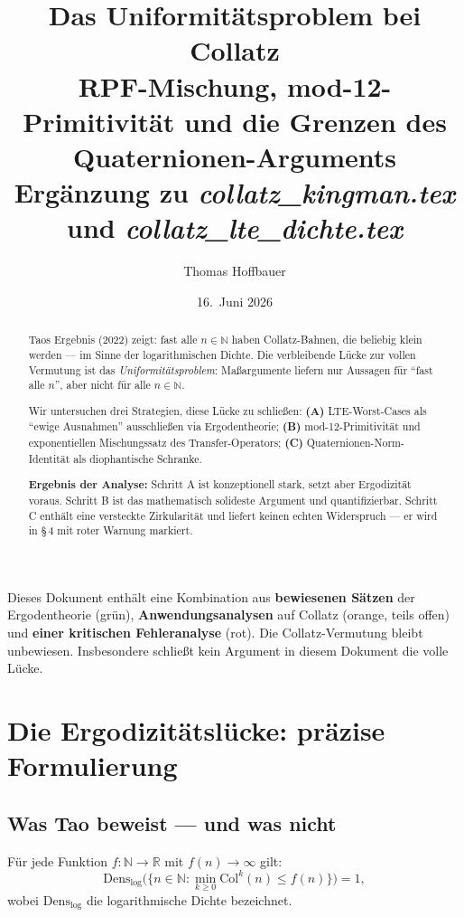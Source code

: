 \documentclass[12pt,a4paper]{article}
\title{%
  Das Uniformitätsproblem bei Collatz\\[0.3em]
  \large RPF-Mischung, mod-12-Primitivität und die Grenzen des
  Quaternionen-Arguments\\[0.5em]
  \normalsize Ergänzung zu \textit{collatz\_kingman.tex} und
  \textit{collatz\_lte\_dichte.tex}%
}
\author{Thomas Hoffbauer}
\date{16.\ Juni 2026}
\newcommand{\N}{\mathbb{N}}
\newcommand{\R}{\mathbb{R}}
\newcommand{\col}{\mathrm{Col}}
\begin{document}
\maketitle

\begin{abstract}
Taos Ergebnis (2022) zeigt: fast alle $n \in \N$ haben Collatz-Bahnen,
die beliebig klein werden --- im Sinne der logarithmischen Dichte.
Die verbleibende Lücke zur vollen Vermutung ist das
\emph{Uniformitätsproblem}: Maßargumente liefern nur Aussagen für
``fast alle $n$'', aber nicht für alle $n \in \N$.

Wir untersuchen drei Strategien, diese Lücke zu schließen:
\textbf{(A)} LTE-Worst-Cases als ``ewige Ausnahmen'' ausschließen via
Ergodentheorie;
\textbf{(B)} mod-12-Primitivität und exponentiellen Mischungssatz
des Transfer-Operators;
\textbf{(C)} Quaternionen-Norm-Identität als diophantische Schranke.

\textbf{Ergebnis der Analyse:}
Schritt A ist konzeptionell stark, setzt aber Ergodizität voraus.
Schritt B ist das mathematisch solideste Argument und quantifizierbar.
Schritt C enthält eine versteckte Zirkularität und liefert
keinen echten Widerspruch --- er wird in \S\,4 mit roter Warnung markiert.
\end{abstract}

\tableofcontents

\bigskip
\begin{tcolorbox}[warnung, title={Einordnung dieses Dokuments}]
Dieses Dokument enthält eine Kombination aus \textbf{bewiesenen Sätzen}
der Ergodentheorie (grün), \textbf{Anwendungsanalysen} auf Collatz
(orange, teils offen) und \textbf{einer kritischen Fehleranalyse} (rot).
Die Collatz-Vermutung bleibt unbewiesen.
Insbesondere schließt kein Argument in diesem Dokument die volle Lücke.
\end{tcolorbox}

\section{Die Ergodizitätslücke: präzise Formulierung}
\label{sec:luecke}

\subsection{Was Tao beweist --- und was nicht}

\begin{tcolorbox}[tao, title={Taos Hauptergebnis (Forum Math.\ Pi, 2022)}]
Für jede Funktion $f: \N \to \R$ mit $f(n) \to \infty$ gilt:
\[
  \mathrm{Dens}_{\log}\bigl(\{n \in \N : \min_{k\geq 0}\col^k(n) \leq f(n)\}\bigr) = 1,
\]
wobei $\mathrm{Dens}_{\log}$ die logarithmische Dichte bezeichnet.
\end{tcolorbox}
\end{document}
